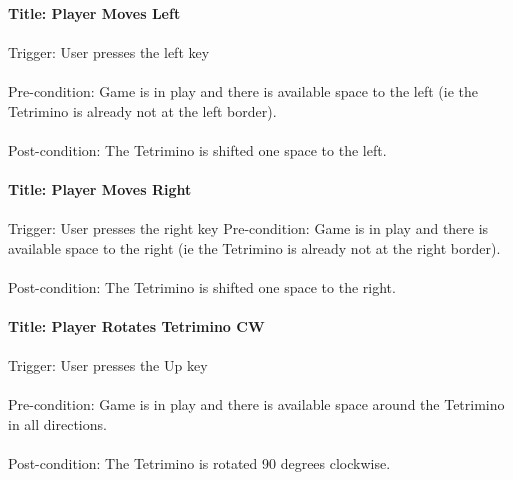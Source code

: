 \documentclass[12pt, titlepage]{article}
\begin{document}
\paragraph{Title: Player Moves Left}
\paragraph{}
Trigger: User presses the left key
\paragraph{}
Pre-condition: Game is in play and there is available space to the left (ie the Tetrimino is already not at the left border).
\paragraph{}
Post-condition: The Tetrimino is shifted one space to the left.

\paragraph{Title: Player Moves Right}
\paragraph{}
Trigger: User presses the right key
Pre-condition: Game is in play and there is available space to the right (ie the Tetrimino is already not at the right border).
\paragraph{}
Post-condition: The Tetrimino is shifted one space to the right.

\paragraph{Title: Player Rotates Tetrimino CW}
\paragraph{}
Trigger: User presses the Up key
\paragraph{}
Pre-condition: Game is in play and there is available space around the Tetrimino in all directions.
\paragraph{}
Post-condition: The Tetrimino is rotated 90 degrees clockwise.
\end{document}
